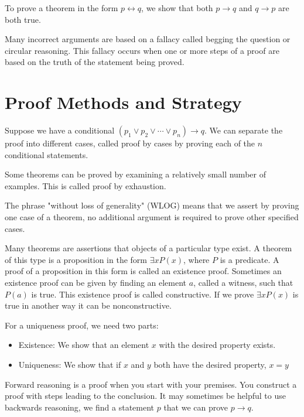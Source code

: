 \documentclass[../discrete.tex]{subfiles}
\begin{document}
To prove a theorem in the form $p\leftrightarrow q$, we show that both $p\rightarrow q$ and $q\rightarrow p$ are both true. 

Many incorrect arguments are based on a fallacy called begging the question or circular reasoning. This fallacy occurs when one or more steps of a proof are based on the truth of the statement being proved.
\section{Proof Methods and Strategy}
Suppose we have a conditional $(p_1\lor p_2\lor \cdots \lor p_n)\rightarrow q$. We can separate the proof into different cases, called proof by cases by proving each of the $n$ conditional statements.

Some theorems can be proved by examining a relatively small number of examples. This is called proof by exhaustion. 

The phrase "without loss of generality" (WLOG) means that we assert by proving one case of a theorem, no additional argument is required to prove other specified cases. 

Many theorems are assertions that objects of a particular type exist. A theorem of this type is a proposition in the form $\exists xP(x)$, where $P$ is a predicate. A proof of a proposition in this form is called an existence proof. Sometimes an existence proof can be given by finding an element $a$, called a witness, such that $P(a)$ is true. This existence proof is called constructive. If we prove $\exists xP(x)$ is true in another way it can be nonconstructive.

For a uniqueness proof, we need two parts:
\begin{itemize}
    \item Existence: We show that an element $x$ with the desired property exists.
    \item Uniqueness: We show that if $x$ and $y$ both have the desired property, $x=y$
\end{itemize}
Forward reasoning is a proof when you start with your premises. You construct a proof with steps leading to the conclusion. It may sometimes be helpful to use backwards reasoning, we find a statement $p$ that we can prove $p\rightarrow q$. 
\end{document}
